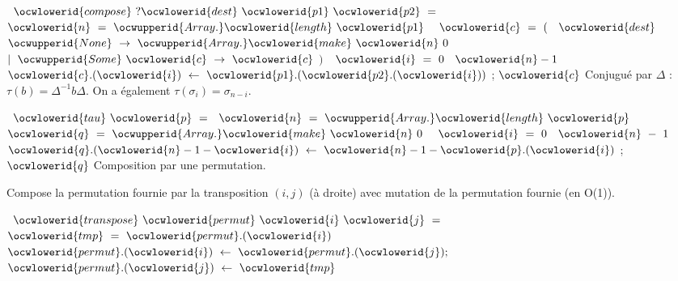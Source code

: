 \documentclass[12pt]{article}
\begin{document}
\ocweol
\label{Permutation.ml:1736}%
\medskip
\ocwbegincode{}\ocwindent{0.00em}
~$\ocwlowerid{compose}~?\ocwlowerid{dest}~\ocwlowerid{p1}~\ocwlowerid{p2}~=$\ocweol
\ocwindent{2.00em}
~$\ocwlowerid{n}~=~\ocwupperid{Array.}\ocwlowerid{length}~\ocwlowerid{p1}~$\ocweol
\ocwindent{2.00em}
~$\ocwlowerid{c}~=~($\ocweol
\ocwindent{2.00em}
~$\ocwlowerid{dest}~$~\ocweol
\ocwindent{4.00em}
$\ocwupperid{None}~\rightarrow{}~\ocwupperid{Array.}\ocwlowerid{make}~\ocwlowerid{n}~0$\ocweol
\ocwindent{3.00em}
$\mid{}~\ocwupperid{Some}~\ocwlowerid{c}~\rightarrow{}~\ocwlowerid{c}$\ocweol
\ocwindent{2.00em}
$)~$\ocweol
\ocwindent{2.00em}
~$\ocwlowerid{i}~=~0~$~$\ocwlowerid{n}-1~$\ocweol
\ocwindent{4.00em}
$\ocwlowerid{c}.(\ocwlowerid{i})~\leftarrow{}~\ocwlowerid{p1}.(\ocwlowerid{p2}.(\ocwlowerid{i}))$\ocweol
\ocwindent{2.00em}
;\ocweol
\ocwindent{2.00em}
$\ocwlowerid{c}$\ocweol
\ocwendcode{}\allowbreak\ocwsection
\label{Permutation.ml:1955}%
Conjugué par $\Delta$ : $\tau(b) = \Delta^{-1}b\Delta$.
   On a également $\tau(\sigma_i) = \sigma_{n-i}$.

\ocweol
\label{Permutation.ml:2069}%
\medskip
\ocwbegincode{}\ocwindent{0.00em}
~$\ocwlowerid{tau}~\ocwlowerid{p}~=$\ocweol
\ocwindent{2.00em}
~$\ocwlowerid{n}~=~\ocwupperid{Array.}\ocwlowerid{length}~\ocwlowerid{p}~$~\ocweol
\ocwindent{2.00em}
~$\ocwlowerid{q}~=~\ocwupperid{Array.}\ocwlowerid{make}~\ocwlowerid{n}~0~$\ocweol
\ocwindent{2.00em}
~$\ocwlowerid{i}~=~0~$~$\ocwlowerid{n}~-~1~$\ocweol
\ocwindent{4.00em}
$\ocwlowerid{q}.(\ocwlowerid{n}-1-\ocwlowerid{i})~\leftarrow{}~\ocwlowerid{n}-1-\ocwlowerid{p}.(\ocwlowerid{i})$\ocweol
\ocwindent{2.00em}
;\ocweol
\ocwindent{2.00em}
$\ocwlowerid{q}$\ocweol
\ocwendcode{}\allowbreak\ocwsection
\label{Permutation.ml:2220}%
Composition par une permutation.

\ocweol
\ocwindent{0.00em}
Compose la permutation fournie par la transposition $(i, j)$ (à droite)
    avec mutation de la permutation fournie (en O(1)).

\ocweol
\label{Permutation.ml:2394}%
\medskip
\ocwbegincode{}\ocwindent{0.00em}
~$\ocwlowerid{transpose}~\ocwlowerid{permut}~\ocwlowerid{i}~\ocwlowerid{j}~=$\ocweol
\ocwindent{2.00em}
~$\ocwlowerid{tmp}~=~\ocwlowerid{permut}.(\ocwlowerid{i})~$\ocweol
\ocwindent{2.00em}
$\ocwlowerid{permut}.(\ocwlowerid{i})~\leftarrow{}~\ocwlowerid{permut}.(\ocwlowerid{j});$\ocweol
\ocwindent{2.00em}
$\ocwlowerid{permut}.(\ocwlowerid{j})~\leftarrow{}~\ocwlowerid{tmp}$\medskip
\end{document}

